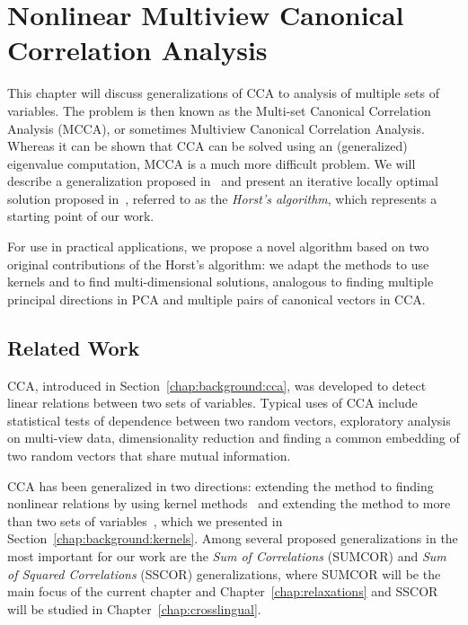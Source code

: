 %
\chapter{Nonlinear Multiview Canonical Correlation Analysis}\label{chap:extensions}

This chapter will discuss generalizations of CCA to
analysis of multiple sets of variables. The
problem is then known as the Multi-set Canonical Correlation Analysis
(MCCA), or sometimes Multiview Canonical Correlation Analysis.
Whereas it can be shown that CCA can be solved using an
(generalized) eigenvalue computation, MCCA is a much more
difficult problem. We will describe a generalization
proposed in~\cite{Kettenring} and present an iterative
locally optimal solution proposed in~\cite{Horst}, referred to
as the \emph{Horst's algorithm}, which
represents a starting point of our work.

For use in practical applications, we propose a novel algorithm based on two original contributions of the Horst's algorithm: we adapt the methods to use kernels and to find
multi-dimensional solutions, analogous to finding multiple principal directions
in PCA and multiple pairs of canonical vectors in CCA.

\section{Related Work}\label{chap:extensions:related}
CCA, introduced in Section~\ref{chap:background:cca}, was developed to detect linear relations between
two sets of variables. Typical uses of CCA include statistical tests of dependence between two random vectors, exploratory
analysis on multi-view data, dimensionality reduction and finding a common embedding
of two random vectors that share mutual information.

CCA has been generalized in two directions: extending the method to finding nonlinear
relations by using kernel methods~\cite{FBMJ}\cite{HardoonCCA} and extending the
method to more than two sets of variables~\cite{Kettenring}, which
we presented in Section~\ref{chap:background:kernels}.
Among several proposed generalizations in \cite{Kettenring} the most important for our work are the \emph{Sum
of Correlations} (SUMCOR) and \emph{Sum of Squared Correlations} (SSCOR) generalizations, where SUMCOR
will be the main focus of the current chapter and Chapter~\ref{chap:relaxations} and SSCOR will
be studied in Chapter~\ref{chap:crosslingual}.


